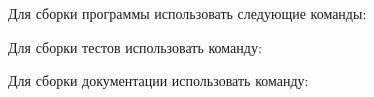 Для сборки программы использовать следующие команды\+: 
\begin{DoxyCode}{0}

\end{DoxyCode}
 Для сборки тестов использовать команду\+: 
\begin{DoxyCode}{0}

\end{DoxyCode}
 Для сборки документации использовать команду\+: 
\begin{DoxyCode}{0}

\end{DoxyCode}
 